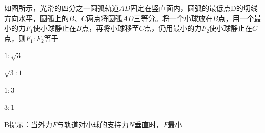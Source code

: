 如图所示，光滑的四分之一圆弧轨道\(AD\)固定在竖直面内，圆弧的最低点D的切线方向水平，圆弧上的\(B\)、\(C\)两点将圆弧\(AD\)三等分。将一个小球放在\(B\)点，用一个最小的力\(F_1\)使小球静止在\(B\)点，再将小球移至\(C\)点，仍用最小的力\(F_2\)使小球静止在\(C\)点，则\(F_1:F_2\)等于\paren[]
	
\begin{choices}
	\item \(1:\sqrt{3}\)
	\item \(\sqrt{3}:1\)
	\item \(1:3\)
	\item \(3:1\)
\end{choices}
\begin{answer}
	B\qquad 提示：当外力\(F\)与轨道对小球的支持力\(N\)垂直时，\(F\)最小
\end{answer}
